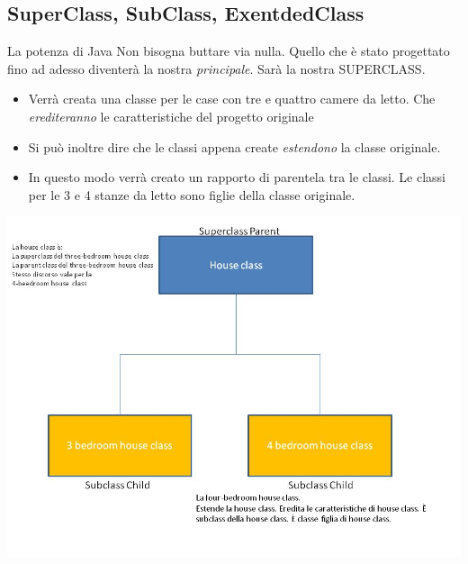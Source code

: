 \subsection*{SuperClass, SubClass, ExentdedClass}
\begin{frame}
\begin{block}{La potenza di Java}
Non bisogna buttare via nulla. Quello che è stato progettato fino ad adesso diventerà la nostra \textit{principale}. Sarà la nostra \alert{SUPERCLASS}.
\end{block}
\begin{block}{}
\begin{itemize}
\item Verrà creata una classe per le case con tre e quattro camere da letto. Che \textit{erediteranno} le caratteristiche del progetto originale 
\item Si può inoltre dire che le classi appena create \textit{estendono} la classe originale.
\item In questo modo verrà creato un rapporto di parentela tra le classi. Le classi per le 3 e 4 stanze da letto sono figlie della classe originale.
\end{itemize}
\end{block}
\end{frame}

\begin{frame}
\centering
\includegraphics[scale = 0.5]{images/superclass.jpg}
\end{frame}

